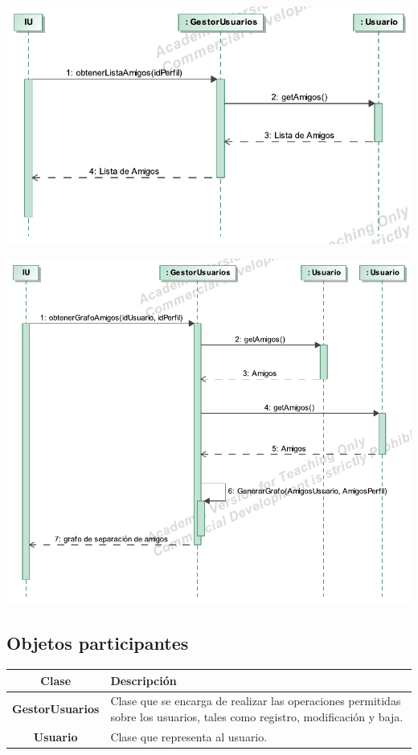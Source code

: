 \documentclass[12pt, a4paper, titlepage]{article}
\begin{document}
\begin{center}
	\includegraphics{Imagenes/OperacionObtenerListaAmigos}
\end{center}

\begin{center}
	\includegraphics{Imagenes/OperacionObtenerGrafoAmigos}
\end{center}

\subsection{Objetos participantes}

\begin{center}
\begin{tabular}{|c|p{12cm}|}
	\hline
	\textbf{Clase} & \textbf{Descripción}\\ \hline
	\textbf{GestorUsuarios} &  Clase que se encarga de realizar las operaciones permitidas sobre los usuarios, tales como registro, modificación y baja.\\ \hline
	\textbf{Usuario} & Clase que representa al usuario. \\ \hline
\end{tabular}

\end{center}
\end{document}
